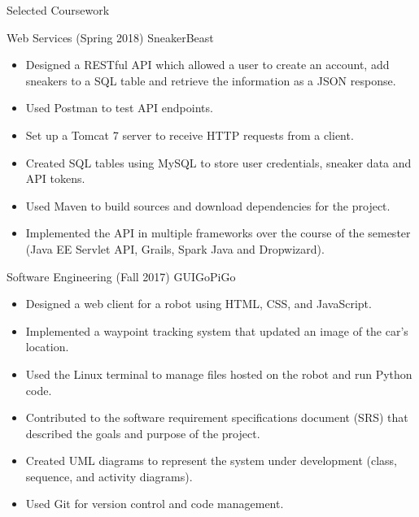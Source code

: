 \documentclass[]{johnsoncv}
\begin{document}
	\begin{cvsection}{Selected Coursework}
		\begin{cvsubsection}{Web Services (Spring 2018)}{}{}
			SneakerBeast
			\begin{itemize}
				\item Designed a RESTful API which allowed a user to create an account, add sneakers to a SQL table and retrieve the information as a JSON response.
				\item Used Postman to test API endpoints.
				\item Set up a Tomcat 7 server to receive HTTP requests from a client.
				\item Created SQL tables using MySQL to store user credentials, sneaker data and API tokens.
				\item Used Maven to build sources and download dependencies for the project.
				\item Implemented the API in multiple frameworks over the course of the semester (Java EE Servlet API, Grails, Spark Java and Dropwizard).
			\end{itemize}
		\end{cvsubsection}	
		
		\begin{cvsubsection}{Software Engineering (Fall 2017)}{}{}
			GUIGoPiGo
			\begin{itemize}
				\item Designed a web client for a robot using HTML, CSS, and JavaScript.
				\item Implemented a waypoint tracking system that updated an image of the car's location.
				\item Used the Linux terminal to manage files hosted on the robot and run Python code.
				\item Contributed to the software requirement specifications document (SRS) that described the goals and purpose of the project.
				\item Created UML diagrams to represent the system under development (class, sequence, and activity diagrams).
				\item Used Git for version control and code management.
			\end{itemize}
		\end{cvsubsection}


\end{cvsection}
\end{document}
